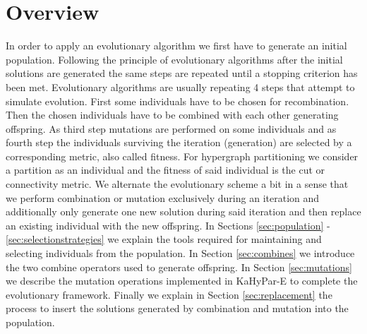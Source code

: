 \documentclass[a4paper,12pt,titlepage, BCOR7mm,headsepline]{scrbook}
\numberwithin{equation}{section}
\begin{document}
\section{Overview}
In order to apply an evolutionary algorithm we first have to generate an initial population. 
Following the principle of evolutionary algorithms after the initial solutions are generated  the same steps are repeated until a stopping criterion has been met.
Evolutionary algorithms are usually repeating 4 steps that attempt to simulate evolution. First some individuals have to be chosen for recombination. Then the chosen individuals have to be combined with each other generating offspring. As third step mutations are performed on some individuals and as fourth step the individuals surviving the iteration (generation) are selected by a corresponding metric, also called fitness. For hypergraph partitioning we consider a partition as an individual and the fitness of said individual is the cut or connectivity metric. We alternate the evolutionary scheme a bit in a sense that we perform combination or mutation exclusively during an iteration and additionally only generate one new solution during said iteration and then replace an existing individual with the new offspring. 
In Sections \ref{sec:population} - \ref{sec:selectionstrategies} we explain the tools required for maintaining and selecting individuals from the population.%
In Section \ref{sec:combines} we introduce the two combine operators used to generate offspring. In Section \ref{sec:mutations} we describe the mutation operations implemented in KaHyPar-E to complete the evolutionary framework. Finally we explain in Section \ref{sec:replacement} the process to insert the solutions generated by combination and mutation into the population.
\end{document}
